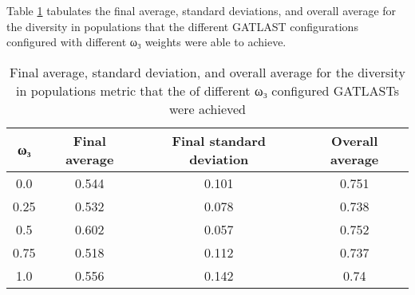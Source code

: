Table \ref{tab:HP:GA:GWeight:diversity in populations} tabulates the final average, standard deviations, and overall average for the diversity in populations that the different GATLAST configurations configured with different ω₃ weights were able to achieve.
\begin{table}[tbh!]
\centering
\begin{adjustbox}{trim=0cm 0cm 0cm 0cm, clip=true}
\begin{tabular}{|c|c|c|c|}
\hline
ω₃ & Final average & Final standard deviation & Overall average\\
\hline
0.0 & 0.544 & 0.101 & 0.751\\\hline
0.25 & 0.532 & 0.078 & 0.738\\\hline
0.5 & 0.602 & 0.057 & 0.752\\\hline
0.75 & 0.518 & 0.112 & 0.737\\\hline
1.0 & 0.556 & 0.142 & 0.74\\\hline
\end{tabular}
\end{adjustbox}
\caption{Final average, standard deviation, and overall average for the diversity in populations metric that the of different ω₃ configured GATLASTs were achieved}
\label{tab:HP:GA:GWeight:diversity in populations}
\end{table}